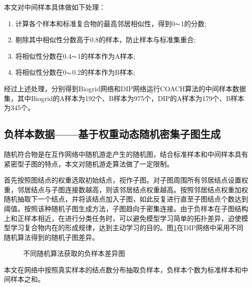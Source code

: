 本文对中间样本具体做如下处理：
\begin{enumerate}
    \item 计算各个样本和标准复合物的最高邻居相似性，得到0$\thicksim$1的分数;
    \item 剔除其中相似性分数高于0.8的样本，防止样本与标准集重合;
    \item 将相似性分数在0.4$\thicksim$1的样本作为A样本;
    \item 将相似性分数在0$\thicksim$0.2的样本作为B样本;
\end{enumerate}

经过上述处理，分别得到Biogrid网络和DIP网络运行COACH算法的中间样本数据集，其中Biogrid的A样本为192个、B样本为975个，DIP的A样本为179个、B样本为345个。

\subsection{负样本数据——基于权重动态随机密集子图生成}
\label{subsection:allSample:negtiveSampleData}


随机符合物是在互作网络中随机游走产生的随机图，结合标准样本和中间样本具有紧密型子图的特点，本文对随机游走算法做了一定限制。

首先按照图结点的权重选取初始结点，视作子图。对子图周围所有邻居结点设置权重，邻居结点与子图连接数越高，则该邻居结点权重越高。按照邻居结点权重加权随机抽取下一个结点，并将该结点加入子图，如此反复进行直至子图结点个数达到阈值。按照该种随机子图生成方法，子图趋向于密集连接。由于负样本在子图结构上和正样本相近，在进行分类任务时，可以避免模型学习简单的拓扑差异，迫使模型学习复合物内在的形成规律，达到主动学习的目的。图\ref{fig:diffrent-random-garphs}在DIP网络中采用不同随机算法得到的随机子图差异。

\begin{figure}[htbp]
    \centering
    \vskip0.5cm
    \caption{不同随机算法获取的负样本差异图}
    \label{fig:diffrent-random-garphs}
\end{figure}


本文在网络中按照真实样本的结点数分布抽取负样本，负样本个数为标准样本和中间样本之和。

